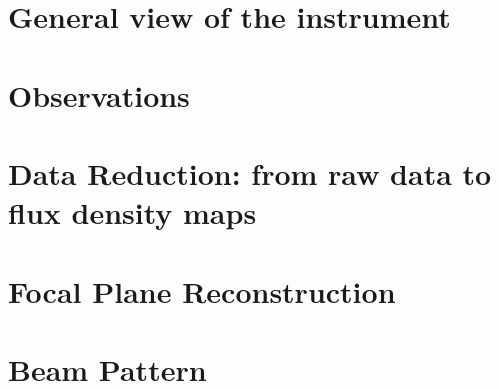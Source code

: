 \documentclass[traditionalabstract]{aa}
\begin{document}
\section{General view of the instrument}
\label{se:instru}



\section{Observations}
\label{se:observations}



\section{Data Reduction: from raw data to flux density maps}
\label{se:dataproc}


\section{Focal Plane Reconstruction}
\label{se:geometry}


\section{Beam Pattern}
\label{se:beam}


\end{document}
